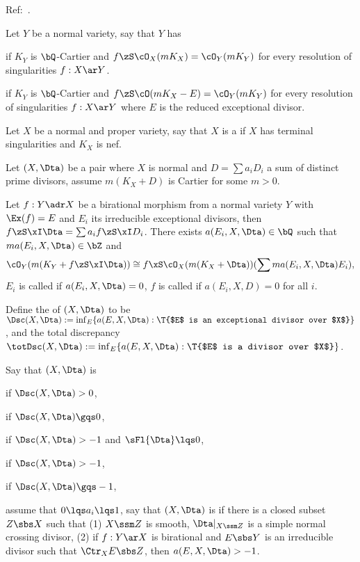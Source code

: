 \documentclass[article, a4paper, twoside]{universal}
\begin{document}
\confighead{}{}{}



Ref:~\cite{KM1998Birational}.

\begin{dfn}[2.11, 2.12]
	Let $Y$ be a normal variety, say that $Y$ has
	\begin{itm}
		\item {} if $K_{Y}$ is $\bQ$-Cartier and $f\zS\cO_{X}(mK_{X})=\cO_{Y}(mK_{Y})$ for every resolution of singularities $f:X\ar Y$.
		\item {} if $K_{Y}$ is $\bQ$-Cartier and $f\zS\cO(mK_{X}-E)=\cO_{Y}(mK_{Y})$ for every resolution of singularities $f:X\ar Y$ where $E$ is the reduced exceptional divisor.
	\end{itm}
\end{dfn}

\begin{dfn}[2.13]
	Let $X$ be a normal and proper variety, say that $X$ is a  if $X$ has terminal singularities and $K_{X}$ is nef.
\end{dfn}

\begin{dfn}[2.25, 2.28, 2.34, 2.37, 6.22]
	Let $(X,\Dta)$ be a pair where $X$ is normal and $D=\sum a_{i}D_{i}$ a sum of distinct prime divisors, assume $m(K_{X}+D)$ is Cartier for some $m>0$.


	Let $f:Y\adr X$ be a birational morphism from a normal variety $Y$ with $\Ex(f)=E$ and $E_{i}$ its irreducible exceptional divisors, then $f\zS\xI\Dta=\sum a_{i}f\zS\xI D_{i}$. There exists $a(E_{i},X,\Dta)\in\bQ$ such that $ma(E_{i},X,\Dta)\in\bZ$ and
	\[
		\cO_{Y}(m(K_{Y}+f\zS\xI\Dta))\cong f\xS\cO_{X}(m(K_{X}+\Dta))(\sum ma(E_{i},X,\Dta)E_{i}),
	\]
	$E_{i}$ is called  if $a(E_{i},X,\Dta)=0$, $f$ is called  if $a(E_{i},X,D)=0$ for all $i$.

	Define the  of $(X,\Dta)$ to be $\Dsc(X,\Dta):=\inf_{E}\{a(E,X,\Dta):\T{$E$ is an exceptional divisor over $X$}\}$, and the total discrepancy $\totDsc(X,\Dta):=\inf_{E}\{a(E,X,\Dta):\T{$E$ is a divisor over $X$}\}$.


	Say that $(X,\Dta)$ is
	\begin{itm}
		\item {} if $\Dsc(X,\Dta)>0$,
		\item {} if $\Dsc(X,\Dta)\gqs0$,
		\item {} if $\Dsc(X,\Dta)>-1$ and $\sFl{\Dta}\lqs0$,
		\item {} if $\Dsc(X,\Dta)>-1$,
		\item {} if $\Dsc(X,\Dta)\gqs-1$,
	\end{itm}
	assume that $0\lqs a_{i}\lqs1$, say that $(X,\Dta)$ is  if there is a closed subset $Z\sbs X$ such that (1) $X\ssm Z$ is smooth, $\Dta|_{X\ssm Z}$ is a simple normal crossing divisor, (2) if $f:Y\ar X$ is birational and $E\sbs Y$ is an irreducible divisor such that $\Ctr_{X}E\sbs Z$, then $a(E,X,\Dta)>-1$.
\end{dfn}
\end{document}
